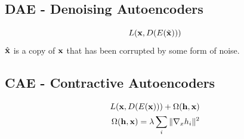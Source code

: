 \subsection{DAE - Denoising Autoencoders}
\begin{equation}
    L(\mathbf{x}, D(E(\tilde{\mathbf{x}})))
\end{equation}
$\hat{\mathbf{x}}$ is a copy of $\mathbf{x}$ that has been corrupted by some form of noise.


\subsection{CAE - Contractive Autoencoders}
\begin{equation}
    \begin{split}
        L(\mathbf{x}, D(E(\mathbf{x}))) + \Omega(\mathbf{h}, \mathbf{x}) \\
        \Omega(\mathbf{h}, \mathbf{x}) = \lambda \sum_i \| \nabla_x h_i \|^2
    \end{split}
\end{equation}


